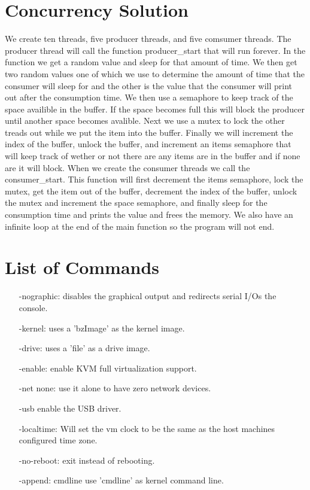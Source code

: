 \documentclass[letterpaper,10pt,titlepage]{article}
\begin{document}
\section{Concurrency Solution}
We create ten threads, five producer threads, and five comsumer threads. The
producer thread will call the function producer\_start that will run forever.
In the function we get a random value and sleep for that amount of time. We then
get two random values one of which we use to determine the amount of time that
the consumer will sleep for and the other is the value that the consumer will
print out after the consumption time. We then use a semaphore to keep track 
of the space availible in the buffer. If the space becomes full this will 
block the producer until another space becomes avalible. Next we use a mutex
to lock the other treads out while we put the item into the buffer. Finally we
will increment the index of the buffer, unlock the buffer, and increment an 
items semaphore that will keep track of wether or not there are any items are 
in the buffer and if none are it will block. When we create the consumer 
threads we call the consumer\_start. This function will first decrement the 
items semaphore, lock the mutex, get the item out of the buffer, decrement the 
index of the buffer, unlock the mutex and increment the space semaphore, and 
finally sleep for the consumption time and prints the value and frees the 
memory. We also have an infinite loop at the end of the main function so the 
program will not end.

\section{List of Commands}
\begin{enumerate}
   \item[-nographic:] disables the graphical output and redirects serial I/Os the console.
   \item[-kernel:] uses a 'bzImage' as the kernel image.
   \item[-drive:] uses a 'file' as a drive image.
   \item[-enable:] enable KVM full virtualization support.
   \item[-net none:] use it alone to have zero network devices.
   \item[-usb] enable the USB driver.
   \item[-localtime:] Will set the vm clock to be the same as the host machines configured 
      time zone.
   \item[-no-reboot:] exit instead of rebooting.
   \item[-append:] cmdline use 'cmdline' as kernel command line.
\end{enumerate}
\end{document}
